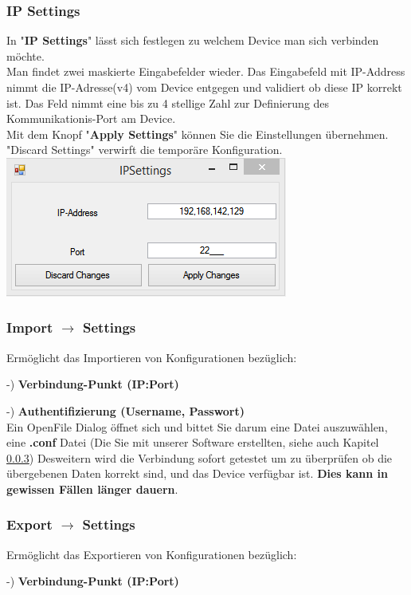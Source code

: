 \documentclass[11pt]{article} %
\begin{document}
\subsubsection{IP Settings}
In "\textbf{IP Settings}" lässt sich festlegen zu welchem Device man sich verbinden möchte.\\
Man findet zwei maskierte Eingabefelder wieder. Das Eingabefeld mit IP-Address nimmt die IP-Adresse(v4) vom Device entgegen und validiert ob diese IP korrekt ist. Das Feld nimmt eine bis zu 4 stellige Zahl zur Definierung des Kommunikationis-Port am Device.\\
Mit dem Knopf "\textbf{Apply Settings}" können Sie die Einstellungen übernehmen. "Discard Settings" verwirft die temporäre Konfiguration.\\
\includegraphics{IP_SETTINGS}
\subsubsection{Import $\rightarrow$ Settings}
\label{sec:FFIS}
Ermöglicht das Importieren von Konfigurationen bezüglich: 

-) \textbf{Verbindung-Punkt (IP:Port)}

-) \textbf{Authentifizierung (Username, Passwort)}\\
Ein OpenFile Dialog öffnet sich und bittet Sie darum eine Datei auszuwählen, eine \textbf{.conf} Datei (Die Sie mit unserer Software erstellten, siehe auch Kapitel \ref{sec:FFES})
Desweitern wird die Verbindung sofort getestet um zu überprüfen ob die übergebenen Daten korrekt sind, und das Device verfügbar ist.
\textbf{Dies kann in gewissen Fällen länger dauern}.\\
\subsubsection{Export $\rightarrow$ Settings}
\label{sec:FFES}
Ermöglicht das Exportieren von Konfigurationen bezüglich: 

-) \textbf{Verbindung-Punkt (IP:Port)}
\end{document}
